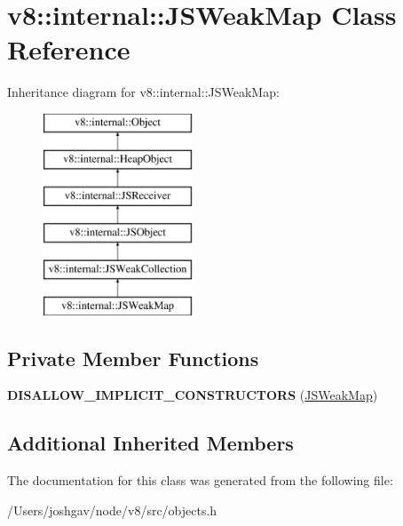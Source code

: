 \hypertarget{classv8_1_1internal_1_1_j_s_weak_map}{}\section{v8\+:\+:internal\+:\+:J\+S\+Weak\+Map Class Reference}
\label{classv8_1_1internal_1_1_j_s_weak_map}
Inheritance diagram for v8\+:\+:internal\+:\+:J\+S\+Weak\+Map\+:\begin{figure}[H]
\begin{center}
\leavevmode
\includegraphics[height=6.000000cm]{classv8_1_1internal_1_1_j_s_weak_map}
\end{center}
\end{figure}
\subsection*{Private Member Functions}
\begin{DoxyCompactItemize}
\item 
{\bfseries D\+I\+S\+A\+L\+L\+O\+W\+\_\+\+I\+M\+P\+L\+I\+C\+I\+T\+\_\+\+C\+O\+N\+S\+T\+R\+U\+C\+T\+O\+RS} (\hyperlink{classv8_1_1internal_1_1_j_s_weak_map}{J\+S\+Weak\+Map})\hypertarget{classv8_1_1internal_1_1_j_s_weak_map_a9a74f3def46cd282fa4fd252436ba539}{}\label{classv8_1_1internal_1_1_j_s_weak_map_a9a74f3def46cd282fa4fd252436ba539}

\end{DoxyCompactItemize}
\subsection*{Additional Inherited Members}


The documentation for this class was generated from the following file\+:\begin{DoxyCompactItemize}
\item 
/\+Users/joshgav/node/v8/src/objects.\+h\end{DoxyCompactItemize}
